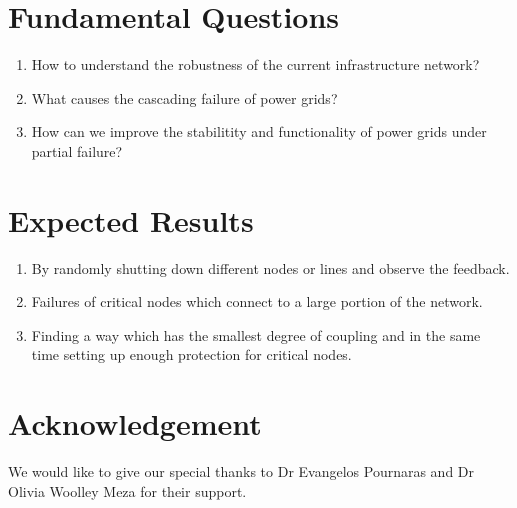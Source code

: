 \documentclass[11pt, a4paper]{article}
\begin{document}
\section{Fundamental Questions}
\begin{enumerate}
\item How to understand the robustness of the current infrastructure network?
\item What causes the cascading failure of power grids?
\item How can we improve the stabilitity and functionality of power grids under partial failure?
\end{enumerate}

\section{Expected Results}
\begin{enumerate}
\item By randomly shutting down different nodes or lines and observe the feedback.
\item Failures of critical nodes which connect to a large portion of the network.
\item Finding a way which has the smallest degree of coupling and in the same time setting up enough protection for critical nodes.
\end{enumerate}


\nocite{*}



\section*{Acknowledgement}
We would like to give our special thanks to Dr Evangelos Pournaras and Dr Olivia Woolley Meza for their support.
\end{document}
